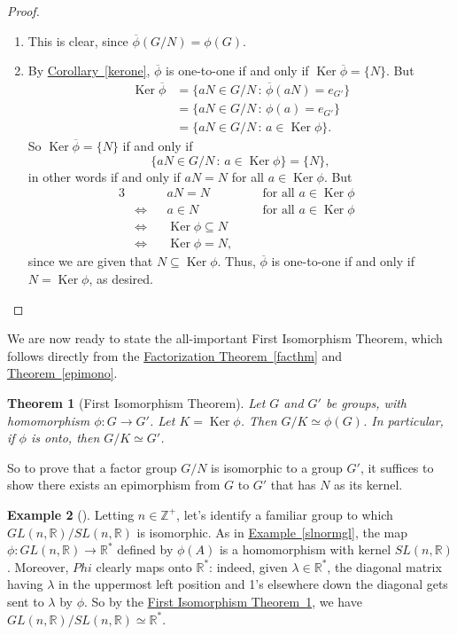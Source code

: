 \documentclass[10pt,]{book}
\theoremstyle{plain}
\newtheorem{theorem}{Theorem}[section]
\theoremstyle{definition}
\theoremstyle{definition}
\theoremstyle{definition}
\newtheorem{example}[theorem]{Example}
\theoremstyle{definition}
\numberwithin{equation}{section}
\def\Z{\mathbb{Z}}
\def\R{\mathbb{R}}
\def\phibar{\overline{\phi}}
\DeclareMathOperator{\Ker}{Ker}
\newcommand{\amp}{&}
\begin{document}
\begin{proof}\hypertarget{proof-52}{}
\leavevmode%
\begin{enumerate}
\item\hypertarget{li-500}{}This is clear, since \(\phibar(G/N)=\phi(G)\).%
\item\hypertarget{li-501}{}By \hyperref[kerone]{Corollary~\ref{kerone}}, \(\phibar\) is one-to-one if and only if \(\Ker
\phibar=\{N\}\).  But%
\begin{align*}
\Ker \phibar\amp =\{aN\in G/N
\,:\, \phibar(aN)=e_{G'}\}\\
\amp =\{aN\in G/N \,:\,
\phi(a)=e_{G'}\}\\
\amp =\{aN\in G/N \,:\, a\in
\Ker\phi\}.
\end{align*}
So \(\Ker \phibar = \{N\}\) if and only if%
\begin{equation*}
\{aN\in G/N\,:\,a\in \Ker\phi\}=\{N\},
\end{equation*}
in other words if and only if \(aN=N\) for all \(a\in \Ker\phi\).  But%
\begin{align*}
{3}
\amp \amp \amp aN=N \amp \amp \ \ \text{ for all \(a\in \Ker\phi\) }\\
\amp \Leftrightarrow  \amp \amp  a\in N \amp \amp \ \ \text{ for all \(a\in \Ker\phi\) }\\
\amp \Leftrightarrow  \amp \amp  \Ker \phi\subseteq N\amp \amp\\
\amp \Leftrightarrow  \amp \amp  \Ker\phi=N,\amp \amp
\end{align*}
since we are given that \(N\subseteq \Ker \phi\). Thus, \(\phibar\) is one-to-one if and only if \(N=\Ker\phi\), as desired.%
\end{enumerate}
\end{proof}
We are now ready to state the all-important First Isomorphism Theorem, which follows directly from the \hyperref[facthm]{Factorization Theorem~\ref{facthm}} and \hyperref[epimono]{Theorem~\ref{epimono}}.%
\begin{theorem}[{First Isomorphism Theorem}]\label{fit}
Let \(G\) and \(G'\) be groups, with homomorphism \(\phi:G \rightarrow G'\). Let \(K=\Ker
\phi\). Then \(G/K \simeq \phi(G)\). In particular, if \(\phi\) is onto, then \(G/K\simeq G'\).%
\end{theorem}
So to prove that a factor group \(G/N\) is isomorphic to a group \(G'\), it suffices to show there exists an epimorphism from \(G\) to \(G'\) that has \(N\) as its kernel.%
\begin{example}[]\label{example-86}
Letting \(n\in \Z^+\), let's identify a familiar group to which \(GL(n,\R)/SL(n,\R)\) is isomorphic. As in \hyperref[slnormgl]{Example~\ref{slnormgl}}, the map \(\phi:GL(n,\R)\to \R^*\) defined by \(\phi(A)\) is a homomorphism with kernel \(SL(n,\R)\). Moreover, \(Phi\) clearly maps onto \(\R^*\): indeed, given \(\lambda \in
\R^*\), the diagonal matrix having \(\lambda\) in the uppermost left position and 1's elsewhere down the diagonal gets sent to \(\lambda\) by \(\phi\). So by the \hyperref[fit]{First Isomorphism Theorem~\ref{fit}}, we have \(GL(n,\R)/SL(n,\R) \simeq \R^*\).%
\end{example}
\end{document}
